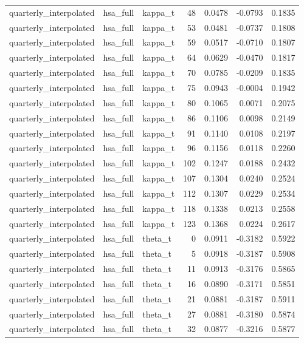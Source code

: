 \begin{tabular}{lllrrrr}
quarterly\_interpolated & hsa\_full & kappa\_t & 48 & 0.0478 & -0.0793 & 0.1835 \\
quarterly\_interpolated & hsa\_full & kappa\_t & 53 & 0.0481 & -0.0737 & 0.1808 \\
quarterly\_interpolated & hsa\_full & kappa\_t & 59 & 0.0517 & -0.0710 & 0.1807 \\
quarterly\_interpolated & hsa\_full & kappa\_t & 64 & 0.0629 & -0.0470 & 0.1817 \\
quarterly\_interpolated & hsa\_full & kappa\_t & 70 & 0.0785 & -0.0209 & 0.1835 \\
quarterly\_interpolated & hsa\_full & kappa\_t & 75 & 0.0943 & -0.0004 & 0.1942 \\
quarterly\_interpolated & hsa\_full & kappa\_t & 80 & 0.1065 & 0.0071 & 0.2075 \\
quarterly\_interpolated & hsa\_full & kappa\_t & 86 & 0.1106 & 0.0098 & 0.2149 \\
quarterly\_interpolated & hsa\_full & kappa\_t & 91 & 0.1140 & 0.0108 & 0.2197 \\
quarterly\_interpolated & hsa\_full & kappa\_t & 96 & 0.1156 & 0.0118 & 0.2260 \\
quarterly\_interpolated & hsa\_full & kappa\_t & 102 & 0.1247 & 0.0188 & 0.2432 \\
quarterly\_interpolated & hsa\_full & kappa\_t & 107 & 0.1304 & 0.0240 & 0.2524 \\
quarterly\_interpolated & hsa\_full & kappa\_t & 112 & 0.1307 & 0.0229 & 0.2534 \\
quarterly\_interpolated & hsa\_full & kappa\_t & 118 & 0.1338 & 0.0213 & 0.2558 \\
quarterly\_interpolated & hsa\_full & kappa\_t & 123 & 0.1368 & 0.0224 & 0.2617 \\
quarterly\_interpolated & hsa\_full & theta\_t & 0 & 0.0911 & -0.3182 & 0.5922 \\
quarterly\_interpolated & hsa\_full & theta\_t & 5 & 0.0918 & -0.3187 & 0.5908 \\
quarterly\_interpolated & hsa\_full & theta\_t & 11 & 0.0913 & -0.3176 & 0.5865 \\
quarterly\_interpolated & hsa\_full & theta\_t & 16 & 0.0890 & -0.3171 & 0.5851 \\
quarterly\_interpolated & hsa\_full & theta\_t & 21 & 0.0881 & -0.3187 & 0.5911 \\
quarterly\_interpolated & hsa\_full & theta\_t & 27 & 0.0881 & -0.3180 & 0.5874 \\
quarterly\_interpolated & hsa\_full & theta\_t & 32 & 0.0877 & -0.3216 & 0.5877 \\

\end{tabular}
